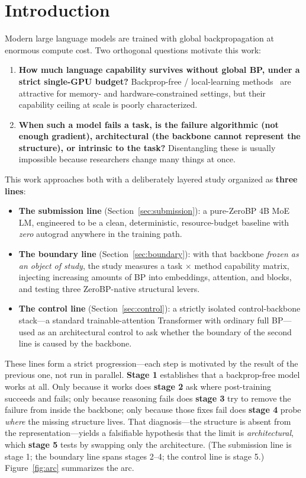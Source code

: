 \documentclass[11pt]{article}
\begin{document}
\section{Introduction}

Modern large language models are trained with global backpropagation at enormous compute cost. Two
orthogonal questions motivate this work:
\begin{enumerate}
\item \textbf{How much language capability survives without global BP, under a strict single-GPU budget?}
Backprop-free / local-learning methods~\cite{hinton2022ff,lee2015difference} are attractive for memory- and
hardware-constrained settings, but their capability ceiling at scale is poorly characterized.
\item \textbf{When such a model fails a task, is the failure algorithmic (not enough gradient), architectural
(the backbone cannot represent the structure), or intrinsic to the task?} Disentangling these is usually
impossible because researchers change many things at once.
\end{enumerate}

This work approaches both with a deliberately layered study organized as \textbf{three lines}:
\begin{itemize}
\item \textbf{The submission line} (Section~\ref{sec:submission}): a pure-ZeroBP 4B MoE LM, engineered to be a
clean, deterministic, resource-budget baseline with \emph{zero} autograd anywhere in the training path.
\item \textbf{The boundary line} (Section~\ref{sec:boundary}): with that backbone \emph{frozen as an object
of study}, the study measures a task $\times$ method capability matrix, injecting increasing amounts of BP
into embeddings, attention, and blocks, and testing three ZeroBP-native structural levers.
\item \textbf{The control line} (Section~\ref{sec:control}): a strictly isolated control-backbone stack---a
standard trainable-attention Transformer with ordinary full BP---used as an architectural control to ask
whether the boundary of the second line is caused by the backbone.
\end{itemize}

These lines form a strict progression---each step is motivated by the result of the previous one, not run in
parallel. \textbf{Stage 1} establishes that a backprop-free model works at all. Only because it works does
\textbf{stage 2} ask where post-training succeeds and fails; only because reasoning fails does
\textbf{stage 3} try to remove the failure from inside the backbone; only because those fixes fail does
\textbf{stage 4} probe \emph{where} the missing structure lives. That diagnosis---the structure is absent
from the representation---yields a falsifiable hypothesis that the limit is \emph{architectural}, which
\textbf{stage 5} tests by swapping only the architecture. (The submission line is stage 1; the boundary line
spans stages 2--4; the control line is stage 5.) Figure~\ref{fig:arc} summarizes the arc.
\end{document}
